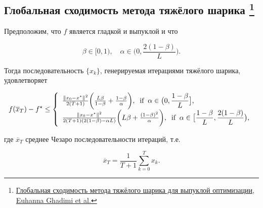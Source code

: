 \documentclass[
  russian,
  letterpaper,
  DIV=11,
  numbers=noendperiod]{scrartcl}
\begin{document}
\subsection[Глобальная сходимость метода тяжёлого шарика
]{\texorpdfstring{Глобальная сходимость метода тяжёлого шарика
\footnote{\href{https://arxiv.org/abs/1412.7457}{Глобальная сходимость
  метода тяжёлого шарика для выпуклой оптимизации, Euhanna Ghadimi et
  al.}}}{Глобальная сходимость метода тяжёлого шарика }}\label{ux433ux43bux43eux431ux430ux43bux44cux43dux430ux44f-ux441ux445ux43eux434ux438ux43cux43eux441ux442ux44c-ux43cux435ux442ux43eux434ux430-ux442ux44fux436ux451ux43bux43eux433ux43e-ux448ux430ux440ux438ux43aux430}

\begin{tcolorbox}[enhanced jigsaw, rightrule=.15mm, coltitle=black, title=\textcolor{quarto-callout-color}{\faInfo}\hspace{0.5em}{Theorem}, colbacktitle=quarto-callout-color!10!white, opacityback=0, colframe=quarto-callout-color-frame, bottomtitle=1mm, toptitle=1mm, titlerule=0mm, arc=.35mm, leftrule=.75mm, breakable, toprule=.15mm, bottomrule=.15mm, opacitybacktitle=0.6, left=2mm, colback=white]

Предположим, что \(f\) является гладкой и выпуклой и что

\[
\beta\in[0,1),\quad \alpha\in\biggl(0,\dfrac{2(1-\beta)}{L}\biggr).
\]

Тогда последовательность \(\{x_k\}\), генерируемая итерациями тяжёлого
шарика, удовлетворяет

\[
f(\overline{x}_T)-f^{\star} \leq  \left\{
\begin{array}[l]{ll}
\frac{\Vert x_{0}-x^\star\Vert^2}{2(T+1)}\biggl(\frac{L\beta}{1-\beta}+\frac{1-\beta}{\alpha}\biggr),\;\;\textup{if}\;\;
\alpha\in\bigl(0,\dfrac{1-\beta}{L}\bigr],\\
\frac{\Vert x_{0}-x^\star\Vert^2}{2(T+1)(2(1-\beta)-\alpha L)}\biggl({L\beta}+\frac{(1-\beta)^2}{\alpha}\biggr),\;\;\textup{if}\;\;
\alpha\in\bigl[\dfrac{1-\beta}{L},\dfrac{2(1-\beta)}{L}\bigr),
\end{array}
\right.
\]

где \(\overline{x}_T\) среднее Чезаро последовательности итераций, т.е.

\[
\overline{x}_T = \frac{1}{T+1}\sum_{k=0}^T x_k.
\]

\end{tcolorbox}
\end{document}
